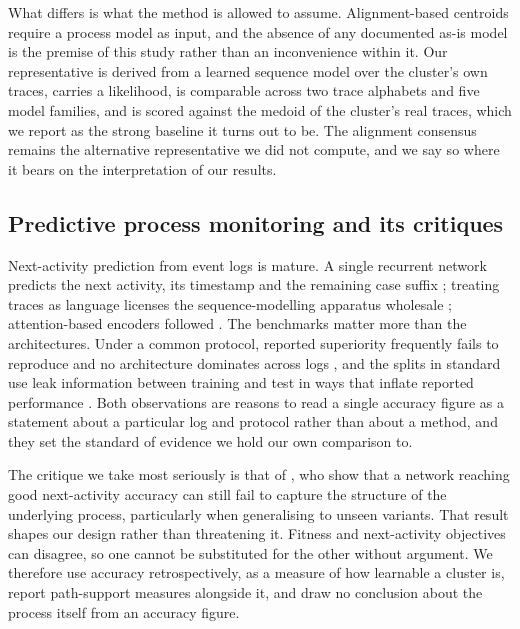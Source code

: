 What differs is what the method is allowed to assume. Alignment-based centroids require a process
model as input, and the absence of any documented as-is model is the premise of this study rather
than an inconvenience within it. Our representative is derived from a learned sequence model over
the cluster's own traces, carries a likelihood, is comparable across two trace alphabets and five
model families, and is scored against the medoid of the cluster's real traces, which we report as
the strong baseline it turns out to be. The alignment consensus remains the alternative
representative we did not compute, and we say so where it bears on the interpretation of our
results.

\subsection{Predictive process monitoring and its critiques}\label{subsec:rw-ppm}

Next-activity prediction from event logs is mature. A single recurrent network predicts the next
activity, its timestamp and the remaining case suffix \citep{tax2017lstm}; treating traces as
language licenses the sequence-modelling apparatus wholesale \citep{evermann2017predicting};
attention-based encoders followed \citep{bukhsh2021processtransformer}. The benchmarks matter more
than the architectures. Under a common protocol, reported superiority frequently fails to
reproduce and no architecture dominates across logs \citep{ramamaneiro2023dlppm}, and the splits
in standard use leak information between training and test in ways that inflate reported
performance \citep{weytjens2022leakage}. Both observations are reasons to read a single accuracy
figure as a statement about a particular log and protocol rather than about a method, and they set
the standard of evidence we hold our own comparison to.

The critique we take most seriously is that of \citet{peeperkorn2023rnnstructure}, who show that a
network reaching good next-activity accuracy can still fail to capture the structure of the
underlying process, particularly when generalising to unseen variants. That result shapes our
design rather than threatening it. Fitness and next-activity objectives can disagree, so one
cannot be substituted for the other without argument. We therefore use accuracy retrospectively,
as a measure of how learnable a cluster is, report path-support measures alongside it, and draw no
conclusion about the process itself from an accuracy figure.

